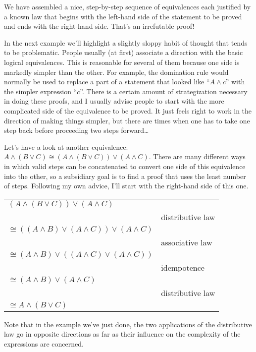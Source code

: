 \documentclass[10pt,]{book}
\theoremstyle{plain}
\theoremstyle{definition}
\theoremstyle{definition}
\numberwithin{equation}{section}
\begin{document}
    We have assembled a nice, step-by-step sequence of equivalences \textemdash{} each
    justified by a known law \textemdash{} that begins with the left-hand side of the
    statement to be proved and ends with the right-hand side. That's an
    irrefutable proof!
\par

    In the next example we'll highlight a slightly sloppy habit of thought
    that tends to be problematic. People usually (at first) associate a
    direction with the basic logical equivalences. This is reasonable
    for several of them because one side is markedly simpler than the
    other. For example, the domination rule would normally be used
    to replace a part of a statement that looked like ``\(A \land c\)'' with
    the simpler expression ``\(c\)''. There is a certain amount of strategization
    necessary in doing these proofs, and I usually advise people to start
    with the more complicated side of the equivalence to be proved. It just
    feels right to work in the direction of making things simpler, but there
    are times when one has to take one step back before proceeding two steps
    forward\dots{}
\par

    Let's have a look at another equivalence: \(A \land (B \lor C) \cong 
    (A \land (B \lor C)) \lor (A \land C)\). There are many different ways
    in which valid steps can be concatenated to convert one side of this
    equivalence into the other, so a subsidiary goal is to find a proof that
    uses the least number of steps. Following my own advice, I'll start
    with the right-hand side of this one.
\begin{tabular}{ll}
\((A \land (B \lor C)) \lor (A \land C)\)&\tabularnewline[0pt]
&distributive law\tabularnewline[0pt]
\(\cong  ((A \land B) \lor (A \land C)) \lor (A \land C)\)&\tabularnewline[0pt]
&associative law\tabularnewline[0pt]
\(\cong  (A \land B) \lor ((A \land C) \lor (A \land C))\)&\tabularnewline[0pt]
&idempotence\tabularnewline[0pt]
\(\cong (A \land B) \lor (A \land C)\)&\tabularnewline[0pt]
&distributive law\tabularnewline[0pt]
\(\cong A \land (B \lor C)\)&
\end{tabular}
\par

    Note that in the example we've just done, the two applications
    of the distributive law go in opposite directions as far as their
    influence on the complexity of the expressions are concerned.
\typeout{************************************************}
\typeout{************************************************}
\end{document}
